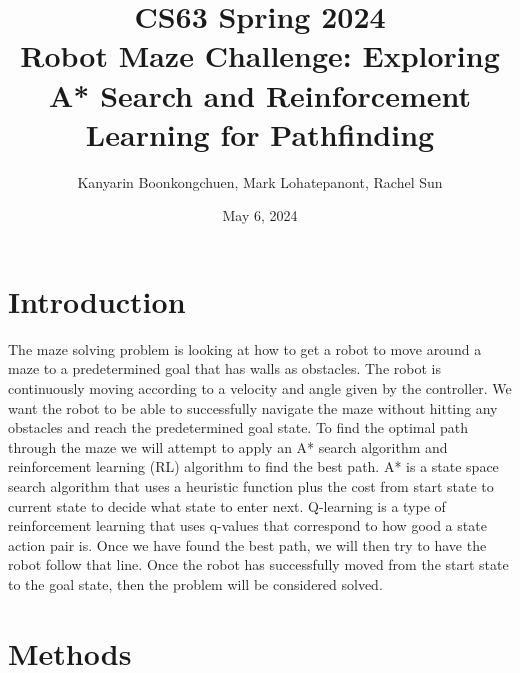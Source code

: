 \documentclass[11pt]{article}
\title{CS63 Spring 2024\\Robot Maze Challenge: Exploring A* Search and Reinforcement Learning for Pathfinding}
\author{Kanyarin Boonkongchuen, Mark Lohatepanont, Rachel Sun}
\date{May 6, 2024}
\begin{document}
\maketitle

\section{Introduction}


The maze solving problem is looking at how to get a robot to move around a maze
to a predetermined goal that has walls as obstacles. The robot is continuously
moving according to a velocity and angle given by the controller. We want the
robot to be able to successfully navigate the maze without hitting any obstacles
and reach the predetermined goal state. To find the optimal path through the
maze we will attempt to apply an A* search algorithm and reinforcement learning
(RL) algorithm to find the best path. A* is a state space search algorithm that
uses a heuristic function plus the cost from start state to current state to
decide what state to enter next. Q-learning is a type of reinforcement learning
that uses q-values that correspond to how good a state action pair is. Once we
have found the best path, we will then try to have the robot follow that line.
Once the robot has successfully moved from the start state to the goal state,
then the problem will be considered solved.

\section{Methods}



\end{document}
